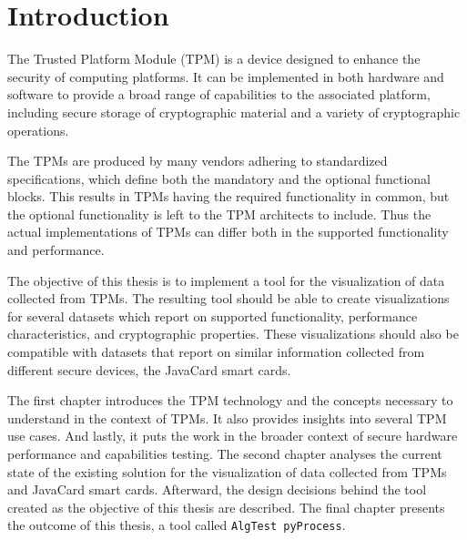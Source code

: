\chapter{Introduction}
The Trusted Platform Module (TPM) is a device designed to enhance the security of computing platforms. It can be implemented in both hardware and software to provide a broad range of capabilities to the associated platform, including secure storage of cryptographic material and a variety of cryptographic operations.

The TPMs are produced by many vendors adhering to standardized specifications, which define both the mandatory and the optional functional blocks. This results in TPMs having the required functionality in common, but the optional functionality is left to the TPM architects to include. Thus the actual implementations of TPMs can differ both in the supported functionality and performance.

The objective of this thesis is to implement a tool for the visualization of data collected from TPMs. The resulting tool should be able to create visualizations for several datasets which report on supported functionality, performance characteristics, and cryptographic properties. These visualizations should also be compatible with datasets that report on similar information collected from different secure devices, the JavaCard smart cards.

The first chapter introduces the TPM technology and the concepts necessary to understand in the context of TPMs. It also provides insights into several TPM use cases. And lastly, it puts the work in the broader context of secure hardware performance and capabilities testing. The second chapter analyses the current state of the existing solution for the visualization of data collected from TPMs and JavaCard smart cards. Afterward, the design decisions behind the tool created as the objective of this thesis are described. The final chapter presents the outcome of this thesis, a tool called \texttt{AlgTest pyProcess}.
